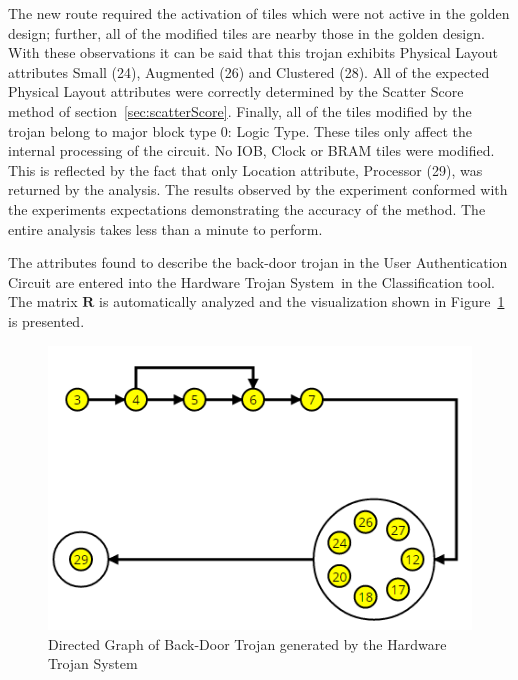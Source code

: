 \documentclass[conference]{IEEEtran}
\newcommand{\WebName}{Hardware Trojan System}
\newcommand{\WebNameNoPeriod}{\WebName~}
\begin{document}
The new route required the activation of tiles which were not active in the \gls{golden} design; further, all of the modified tiles are nearby those in the \gls{golden} design. 
With these observations it can be said that this trojan exhibits Physical Layout attributes Small (24), Augmented (26) and Clustered (28). 
All of the expected Physical Layout attributes were correctly determined by the Scatter Score method of section~\ref{sec:scatterScore}.
Finally, all of the tiles modified by the trojan belong to major block type 0: Logic Type.
These tiles only affect the internal processing of the circuit.
No \acrshort{IOB}, Clock or \acrshort{BRAM} tiles were modified.
This is reflected by the fact that only Location attribute, Processor (29), was returned by the analysis.
The results observed by the experiment conformed with the experiments expectations demonstrating the accuracy of the method.
The entire analysis takes less than a minute to perform.

The attributes found to describe the back-door trojan in the User Authentication Circuit are entered into the \WebNameNoPeriod in the Classification tool.
The matrix $\mathbf{R}$ is automatically analyzed and the visualization shown in Figure~\ref{fig:backDoorVisual} is presented.
\begin{figure}[h]
	\centering
	\includegraphics[width=0.91\linewidth]{Figures/backDoorVisual}
	\caption[Directed Graph of Back-Door Trojan generated by the \WebName]{Directed Graph of Back-Door Trojan generated by the \WebName}
	\label{fig:backDoorVisual}
\end{figure}
\end{document}

